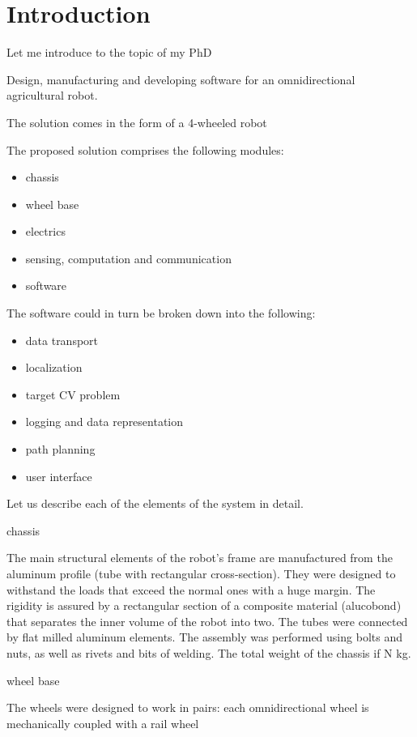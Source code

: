 \chapter{Introduction}

Let me introduce to the topic of my PhD 

Design, manufacturing and developing software for an omnidirectional agricultural robot.

The solution comes in the form of a 4-wheeled robot 

The proposed solution comprises the following modules:

\begin{itemize}
    \item chassis
    \item wheel base
    \item electrics
    \item sensing, computation and communication
    \item software
\end{itemize}

The software could in turn be broken down into the following:

\begin{itemize}
    \item data transport
    \item localization
    \item target CV problem
    \item logging and data representation
    \item path planning
    \item user interface
\end{itemize}

Let us describe each of the elements of the system in detail.

chassis

The main structural elements of the robot's frame are manufactured from the aluminum profile (tube with rectangular cross-section).
They were designed to withstand the loads that exceed the normal ones with a huge margin.
The rigidity is assured by a rectangular section of a composite material (alucobond) that separates the inner volume of the robot into two.
The tubes were connected by flat milled aluminum elements.
The assembly was performed using bolts and nuts, as well as rivets and bits of welding.
The total weight of the chassis if N \si{kg}.

wheel base

The wheels were designed to work in pairs: each omnidirectional wheel is mechanically coupled with a rail wheel

